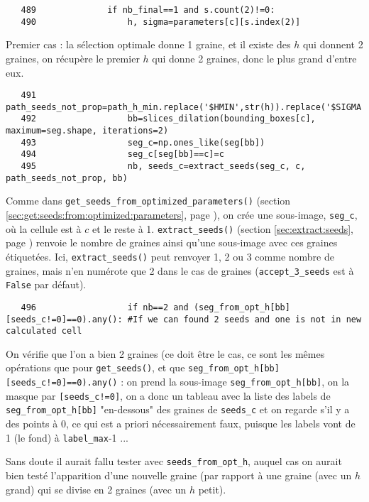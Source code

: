 \documentclass{article}
\def \mycolor {red}
\begin{document}
\color{black}
\begin{verbatim} 
   489	            if nb_final==1 and s.count(2)!=0:
   490	                h, sigma=parameters[c][s.index(2)]
\end{verbatim} 
\color{\mycolor}
Premier cas : la s\'election optimale donne 1 graine, et il existe des $h$ qui donnent 2 graines, on r\'ecup\`ere le premier $h$ qui donne 2 graines, donc le plus grand d'entre eux.
\color{black}
\begin{verbatim} 
   491	                path_seeds_not_prop=path_h_min.replace('$HMIN',str(h)).replace('$SIGMA',str(sigma));
   492	                bb=slices_dilation(bounding_boxes[c], maximum=seg.shape, iterations=2)
   493	                seg_c=np.ones_like(seg[bb])
   494	                seg_c[seg[bb]==c]=c
   495	                nb, seeds_c=extract_seeds(seg_c, c, path_seeds_not_prop, bb)
\end{verbatim} 
\color{\mycolor}
Comme dans \texttt{get\_seeds\_from\_optimized\_parameters()} (section \ref{sec:get:seeds:from:optimized:parameters}, page \pageref{sec:get:seeds:from:optimized:parameters}), on cr\'ee une sous-image, \verb|seg_c|, o\`u la cellule est \`a $c$ et le reste \`a 1.
\texttt{extract\_seeds()} (section \ref{sec:extract:seeds}, page \pageref{sec:extract:seeds}) renvoie le nombre de graines ainsi qu'une sous-image avec ces graines \'etiquet\'ees. Ici, \texttt{extract\_seeds()} peut renvoyer 1, 2 ou 3 comme nombre de graines, mais n'en num\'erote que 2 dans le cas de graines (\texttt{accept\_3\_seeds} est \`a \texttt{False} par d\'efaut).
\color{black}
\begin{verbatim} 
   496	                if nb==2 and (seg_from_opt_h[bb][seeds_c!=0]==0).any(): #If we can found 2 seeds and one is not in new calculated cell
\end{verbatim} 
\color{\mycolor}
On v\'erifie que l'on a bien 2 graines (ce doit \^etre le cas, ce sont les m\^emes op\'erations que pour \texttt{get\_seeds()}, et que \verb|seg_from_opt_h[bb][seeds_c!=0]==0).any()| : on prend la sous-image \verb|seg_from_opt_h[bb]|, on la masque par \verb|[seeds_c!=0]|, on a donc un tableau avec la liste des labels de  \verb|seg_from_opt_h[bb]| "en-dessous" des graines de \verb|seeds_c| et on regarde s'il y a des points \`a 0, ce qui est a priori n\'ecessairement faux, puisque les labels vont de 1 (le fond) \`a \verb|label_max|-1 ...

Sans doute il aurait fallu tester avec \verb|seeds_from_opt_h|, auquel cas on aurait bien test\'e l'apparition d'une nouvelle graine (par rapport \`a une graine (avec un $h$ grand) qui se divise en 2 graines (avec un $h$ petit).
\end{document}
